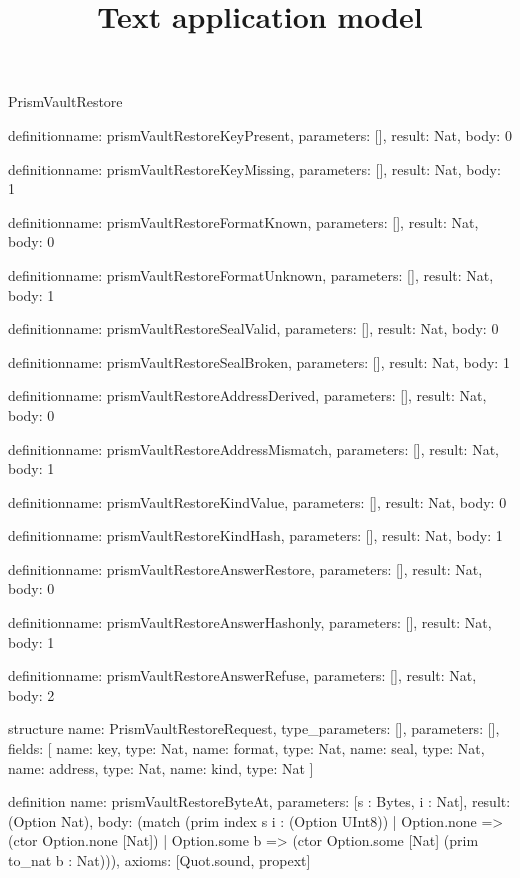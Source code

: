 \begin{lexlean}{PrismVaultRestore}
\title{Text application model}
\begin{semanticmodule}
definition{name: prismVaultRestoreKeyPresent, parameters: [], result: Nat, body: 0}

definition{name: prismVaultRestoreKeyMissing, parameters: [], result: Nat, body: 1}

definition{name: prismVaultRestoreFormatKnown, parameters: [], result: Nat, body: 0}

definition{name: prismVaultRestoreFormatUnknown, parameters: [], result: Nat, body: 1}

definition{name: prismVaultRestoreSealValid, parameters: [], result: Nat, body: 0}

definition{name: prismVaultRestoreSealBroken, parameters: [], result: Nat, body: 1}

definition{name: prismVaultRestoreAddressDerived, parameters: [], result: Nat, body: 0}

definition{name: prismVaultRestoreAddressMismatch, parameters: [], result: Nat, body: 1}

definition{name: prismVaultRestoreKindValue, parameters: [], result: Nat, body: 0}

definition{name: prismVaultRestoreKindHash, parameters: [], result: Nat, body: 1}

definition{name: prismVaultRestoreAnswerRestore, parameters: [], result: Nat, body: 0}

definition{name: prismVaultRestoreAnswerHashonly, parameters: [], result: Nat, body: 1}

definition{name: prismVaultRestoreAnswerRefuse, parameters: [], result: Nat, body: 2}

structure{
  name: PrismVaultRestoreRequest,
  type_parameters: [],
  parameters: [],
  fields: [
    {name: key, type: Nat},
    {name: format, type: Nat},
    {name: seal, type: Nat},
    {name: address, type: Nat},
    {name: kind, type: Nat}
  ]
}

definition{
  name: prismVaultRestoreByteAt,
  parameters: [s : Bytes, i : Nat],
  result: (Option Nat),
  body: (match (prim index s i : (Option UInt8))
    | Option.none => (ctor Option.none [Nat])
    | Option.some b => (ctor Option.some [Nat] (prim to_nat b : Nat))),
  axioms: [Quot.sound, propext]
}


\end{semanticmodule}
\end{lexlean}
